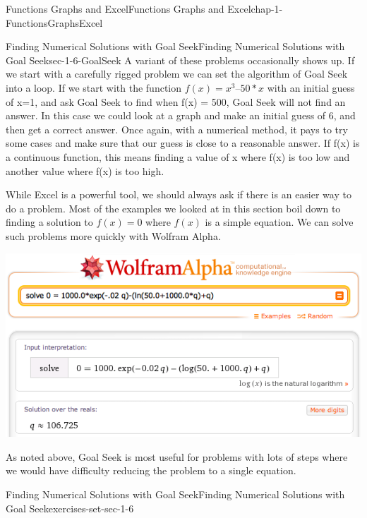 \documentclass[oneside,10pt,]{book}
\numberwithin{equation}{section}
\begin{document}
\begin{chapterptx}{Functions Graphs and Excel}{}{Functions Graphs and Excel}{}{}{chap-1-FunctionsGraphsExcel}
\begin{sectionptx}{Finding Numerical Solutions with Goal Seek}{}{Finding Numerical Solutions with Goal Seek}{}{}{sec-1-6-GoalSeek}
A variant of these problems occasionally shows up.  If we start with a carefully rigged problem we can set the algorithm of Goal Seek into a loop.  If we start with the function \(f(x) = x^3 – 50*x\) with an initial guess of x=1, and ask Goal Seek to find when f(x) = 500,  Goal Seek will not find an answer.  In this case we could look at a graph and make an initial guess of 6, and then get a correct answer.  Once again, with a numerical method, it pays to try some cases and make sure that our guess is close to a reasonable answer.  If f(x) is a continuous function, this means finding a value of x where f(x) is too low and another value where f(x) is too high.%
\par
\hypertarget{p-500}{}%
While Excel is a powerful tool, we should always ask if there is an easier way to do a problem.  Most of the examples we looked at in this section boil down to finding a solution to \(f(x)=0\) where \(f(x)\) is a simple equation.  We can solve such problems more quickly with Wolfram Alpha. \begin{sidebyside}{1}{0.1}{0.1}{0}%
\begin{sbspanel}{0.8}%
\includegraphics[width=1\linewidth]{images/sec1-6-16.png}
\end{sbspanel}%
\end{sidebyside}%
%
\par
\hypertarget{p-501}{}%
As noted above, Goal Seek is most useful for problems with lots of steps where we would have difficulty reducing the problem to a single equation.%
%
%
\typeout{************************************************}
\typeout{************************************************}
%
\begin{exercises-subsection-numberless}{Finding Numerical Solutions with Goal Seek}{}{Finding Numerical Solutions with Goal Seek}{}{}{exercises-set-sec-1-6}

\end{exercises-subsection-numberless}
\end{sectionptx}
\end{chapterptx}
\end{document}
